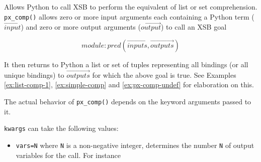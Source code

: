 \begin{description}
%
%
%     

%
  Allows Python to call XSB to perform the equivalent of list or set
  comprehension.  {\tt px\_comp()} allows zero or more input arguments
  each containing a Python term ($\overrightarrow{input}$) and zero or
  more output arguments ($\overrightarrow{output}$) to call an XSB goal

\[module:pred(\overrightarrow{inputs},\overrightarrow{outputs}) \]

It then returns to Python a list or set of tuples representing all
bindings (or all unique bindings) to $\overrightarrow{outputs}$ for
which the above goal is true.  See Examples \ref{ex:list-comp-1},
\ref{ex:simple-comp} and \ref{ex:px-comp-undef} for elaboration on
this.

The actual behavior of {\tt px\_comp()} depends on the keyword
arguments passed to it.

{\tt kwargs} can take the following values:
\begin{itemize}
  \item {\tt vars=N} where {\tt N} is a non-negative integer,
    determines the number {\tt N} of output variables for the call.
    For instance
    

\end{itemize}
\end{description}
